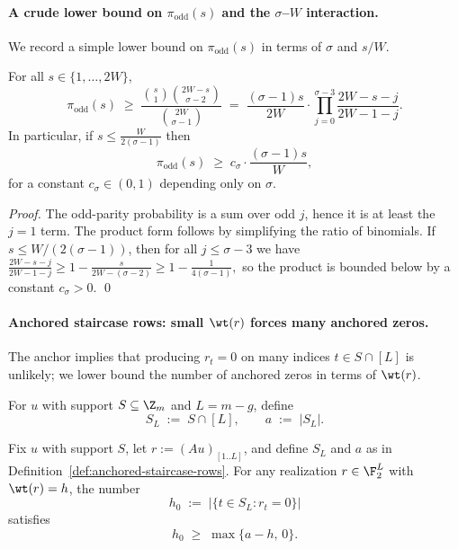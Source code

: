 \paragraph{A crude lower bound on $\pi_{\mathrm{odd}}(s)$ and the $\sigma$--$W$ interaction.}
We record a simple lower bound on $\pi_{\mathrm{odd}}(s)$ in terms of $\sigma$ and $s/W$.

\begin{lemma}[Lower bound on $\pi_{\mathrm{odd}}(s)$ via the $j=1$ term]
\label{lem:pi-odd-lower}
For all $s\in\{1,\dots,2W\}$,
\[
\pi_{\mathrm{odd}}(s)
\;\ge\;
\frac{\binom{s}{1}\binom{2W-s}{\sigma-2}}{\binom{2W}{\sigma-1}}
\;=\;
\frac{(\sigma-1)s}{2W}\cdot \prod_{j=0}^{\sigma-3}\frac{2W-s-j}{2W-1-j}.
\]
In particular, if $s\le \frac{W}{2(\sigma-1)}$ then
\[
\pi_{\mathrm{odd}}(s)\;\ge\; c_\sigma\cdot \frac{(\sigma-1)s}{W},
\]
for a constant $c_\sigma\in(0,1)$ depending only on $\sigma$.
\end{lemma}

\begin{proof}
The odd-parity probability is a sum over odd $j$, hence it is at least the $j=1$ term.
The product form follows by simplifying the ratio of binomials.
If $s\le W/(2(\sigma-1))$, then for all $j\le \sigma-3$ we have
\(
\frac{2W-s-j}{2W-1-j}\ge 1-\frac{s}{2W-(\sigma-2)}\ge 1-\frac{1}{4(\sigma-1)},
\)
so the product is bounded below by a constant $c_\sigma>0$.
\qed
\end{proof}

\paragraph{Anchored staircase rows: small $\wt(r)$ forces many anchored zeros.}
The anchor implies that producing $r_t=0$ on many indices $t\in S\cap[L]$ is unlikely; we lower bound the number of
anchored zeros in terms of $\wt(r)$.

\begin{definition}
\label{def:anchored-staircase-rows}
For $u$ with support $S\subseteq\Z_m$ and $L=m-g$, define
\[
S_L \;:=\; S\cap [L],
\qquad
a \;:=\; |S_L|.
\]
\end{definition}

\begin{lemma}
\label{lem:anchored-zero-lb}
Fix $u$ with support $S$, let $r:=(Au)_{[1..L]}$, and define $S_L$ and $a$ as in
Definition~\ref{def:anchored-staircase-rows}.
For any realization $r\in\F_2^L$ with $\wt(r)=h$, the number
\[
h_0 \;:=\; |\{t\in S_L : r_t=0\}|
\]
satisfies
\[
h_0 \;\ge\; \max\{a-h,\,0\}.
\]
\end{lemma}

